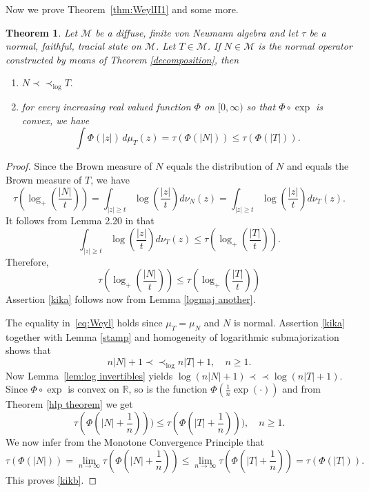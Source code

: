 \documentclass{amsart}
\theoremstyle{plain}
\newtheorem{thm}{Theorem}
\theoremstyle{remark}
\begin{document}
Now we prove Theorem~\ref{thm:WeylII1} and some more.
\begin{thm} Let $\mathcal{M}$ be a
diffuse, finite von Neumann algebra and let $\tau$ be a normal, faithful, tracial state on $\mathcal{M}$.
Let $T\in\mathcal{M}$.
If $N\in\mathcal{M}$ is the normal operator constructed by means of Theorem \ref{decomposition}, then
\begin{enumerate}[{\rm (a)}]
\item\label{kika} $N\prec\prec_{\log}T.$
\item\label{kikb} for every increasing real valued function $\Phi$ on $[0,\infty)$ so that $\Phi\circ\exp$ is convex, we have
\begin{equation}\label{eq:Weyl}
\int\Phi(|z|)\,d\mu_T(z)=\tau(\Phi(|N|))\leq\tau(\Phi(|T|)).
\end{equation}
\end{enumerate}
\end{thm}
\begin{proof} Since the Brown measure of $N$ equals the distribution of $N$ and equals the Brown measure of $T$, we have
$$\tau(\log_+(\frac{|N|}{t}))=\int_{|z|\geq t}\log(\frac{|z|}{t})d\nu_N(z)=\int_{|z|\geq t}\log(\frac{|z|}{t})d\nu_T(z).$$
It follows from Lemma 2.20 in \cite{HS1} that
$$\int_{|z|\geq t}\log(\frac{|z|}{t})d\nu_T(z)\leq\tau(\log_+(\frac{|T|}{t})).$$
Therefore,
$$\tau(\log_+(\frac{|N|}{t}))\leq\tau(\log_+(\frac{|T|}{t}))$$
Assertion \eqref{kika} follows now from Lemma \ref{logmaj another}.

The equality in~\eqref{eq:Weyl} holds since $\mu_T=\mu_N$ and $N$ is normal.
Assertion \eqref{kika} together with Lemma \ref{stamp} and homogeneity of logarithmic submajorization shows that
$$n|N|+1\prec\prec_{\log}n|T|+1,\quad n\geq1.$$
Now Lemma~\ref{lem:log invertibles} yields $\log(n|N|+1)\prec\prec\log(n|T|+1)$.
Since $\Phi\circ\exp$ is convex on $\mathbb{R}$, so is the function $\Phi(\frac1n\exp(\cdot))$ and
from Theorem \ref{hlp theorem} we get
$$\tau(\Phi(|N|+\frac1n)))\leq\tau(\Phi(|T|+\frac1n))),\quad n\geq 1.$$
We now infer from the Monotone Convergence Principle that
$$\tau(\Phi(|N|))=\lim_{n\to\infty}\tau(\Phi(|N|+\frac1n))\leq\lim_{n\to\infty}\tau(\Phi(|T|+\frac1n))=\tau(\Phi(|T|)).$$
This proves \eqref{kikb}.
\end{proof}
\end{document}
